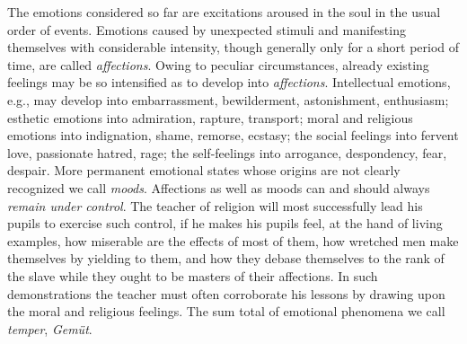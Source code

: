 The emotions considered so far are excitations aroused in the soul in the usual order of events. Emotions caused by unexpected stimuli and manifesting themselves with considerable intensity, though generally only for a short period
of time, are called \emph{affections}. Owing to peculiar circumstances, already existing feelings may be so intensified as to develop into \emph{affections}. Intellectual emotions, e.g., may develop into embarrassment, bewilderment, astonishment, enthusiasm; esthetic emotions into admiration, rapture, transport; moral and religious emotions into indignation, shame, remorse, ecstasy; the social feelings into fervent love, passionate hatred, rage; the self-feelings into arrogance, despondency, fear, despair. More permanent emotional states whose origins are not clearly recognized we call \emph{moods}. Affections as well as moods can and should always \emph{remain under control}. The teacher of religion will most successfully lead his pupils to exercise such control, if he makes his pupils feel, at the hand of living examples, how miserable are the effects of most of them, how wretched men make themselves by yielding to them, and how they debase themselves to the rank of the slave while they ought to be masters of their affections. In such demonstrations the teacher must often corroborate his lessons by drawing upon the moral and religious feelings. The sum total of emotional phenomena we call \emph{temper}, \emph{Gemüt}.

